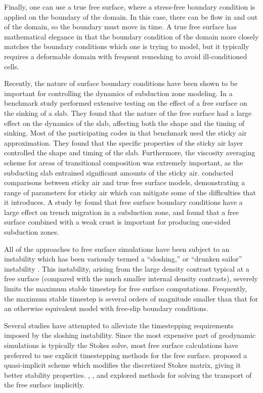\documentclass[preprint,12pt,authoryear]{elsarticle}
\begin{document}
Finally, one can use a true free surface, where a stress-free boundary condition is applied on the boundary 
of the domain. In this case, there can be flow in and out of the domain, so the boundary must move in time.
A true free surface has mathematical elegance in that the boundary condition of the domain more closely 
matches the boundary conditions which one is trying to model, but it typically requires a deformable 
domain with frequent remeshing to avoid ill-conditioned cells. 

Recently, the nature of surface boundary conditions have been shown to be important for controlling the 
dynamics of subduction zone modeling.  In a benchmark study \citet{schmeling2008benchmark} performed extensive testing on the effect
of a free surface on the sinking of a slab. They found that the nature of the free surface had a large effect 
on the dynamics of the slab, affecting both the shape and the timing of sinking. Most of the 
participating codes in that benchmark used the sticky air approximation.
They found that the specific properties of the sticky air layer controlled the shape and timing of the slab.
Furthermore, the viscosity averaging scheme for areas of transitional
composition was extremely important, as the subducting slab entrained significant amounts of the sticky air.
\citet{crameri2012comparison} conducted comparisons between sticky air and true free surface models, 
demonstrating a range of parameters for sticky air which can mitigate some of the difficulties that it introduces.
A study by \citet{quinquis2011role} found that free surface boundary conditions have a large effect on 
trench migration in a subduction zone, and \citet{crameri2012free} found that a free surface combined 
with a weak crust is important for producing one-sided subduction zones.

All of the approaches to free surface simulations have been subject to an instability which has been 
variously termed a ``sloshing,'' or ``drunken sailor'' instability \citep{kaus2010stabilization, duretz2011discretization, kramer2012implicit}. 
This instability, arising from the large density contrast typical at a free surface (compared with the much smaller 
internal density contrasts), severely limits the maximum stable timestep for free surface computations.
Frequently, the maximum stable timestep is several orders of magnitude smaller than that for an otherwise 
equivalent model with free-slip boundary conditions.

Several studies have attempted to alleviate the timestepping requirements imposed by the sloshing 
instability. Since the most expensive part of geodynamic simulations is typically the Stokes solve,
most free surface calculations have preferred to use explicit timestepping methods for the free 
surface. \citet{kaus2010stabilization} proposed a quasi-implicit scheme which modifies the discretized 
Stokes matrix, giving it better stability properties.  \citet{popov2008slim3d}, \citet{kramer2012implicit}, and \citet{furuichi2015implicit}
explored methods for solving the transport of the free surface implicitly.
\end{document}
